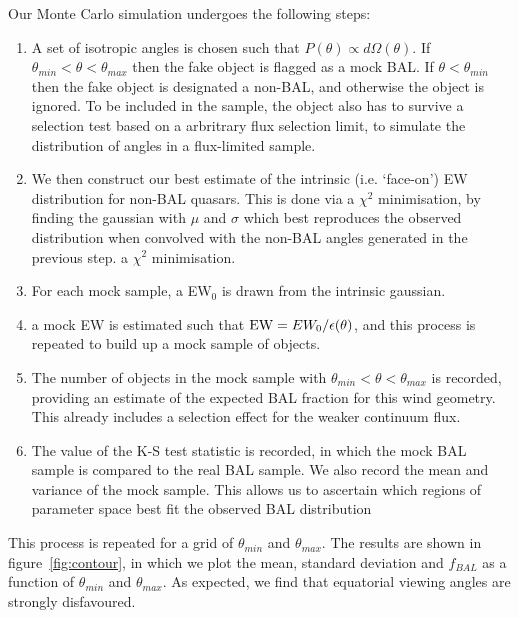 Our Monte Carlo simulation undergoes the following steps:

\begin{enumerate}
	\setlength\itemsep{1em}
	\item A set of isotropic angles is chosen such that $P(\theta)\propto d\Omega(\theta)$.
	If $\theta_{min}<\theta<\theta_{max}$ then the fake object is flagged as a mock BAL. 
	If $\theta<\theta_{min}$ then the fake object is designated a non-BAL, and otherwise
	the object is ignored. To be included in the sample, the object also has to 
	survive a selection test based on a arbritrary flux selection limit, to simulate the
	distribution of angles in a flux-limited sample.
	\item We then construct our best estimate of the intrinsic (i.e. `face-on')
	EW distribution for non-BAL quasars. This is done via a $\chi^2$ minimisation,
	by finding the gaussian with $\mu$ and $\sigma$ which best 
	reproduces the observed distribution when convolved with
	the non-BAL angles generated in the previous step. 
	a $\chi^2$ minimisation.
	\item For each mock sample, a EW$_0$ is drawn from the intrinsic gaussian.
	\item a mock EW is estimated such that ${\rm EW} = EW_0 / \epsilon(\theta)$,
	and this process is repeated to build up a mock sample of objects.
	\item The number of objects in the mock sample with 
	$\theta_{min}<\theta<\theta_{max}$ is recorded, providing an 
	estimate of the expected BAL fraction for this wind geometry. 
	This already includes a selection effect for the weaker continuum flux.
	\item The value of the K-S test statistic is recorded, in which the 
	mock BAL sample is compared to the real BAL sample. We also record the 
	mean and variance of the mock sample. This allows us to ascertain which regions
	of parameter space best fit the observed BAL distribution
\end{enumerate}

This process is repeated for a grid of $\theta_{min}$ and $\theta_{max}$. The 
results are shown in figure~\ref{fig:contour}, in which we plot the mean, standard deviation 
and $f_{BAL}$ as a function of $\theta_{min}$ and $\theta_{max}$. As expected,
we find that equatorial viewing angles are strongly disfavoured. 





